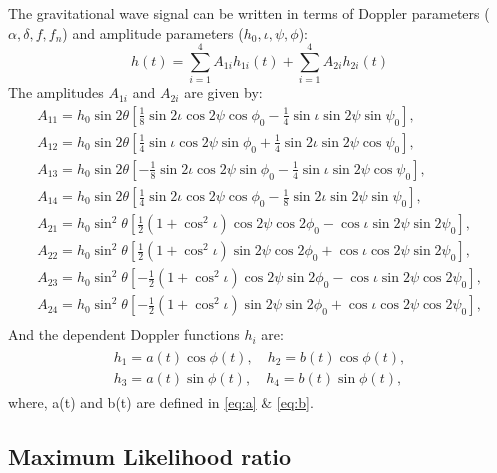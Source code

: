 \documentclass{ttuthes2007}
\begin{document}
The gravitational wave signal can be written in terms of Doppler
parameters ($\alpha, \delta, f, f_n $) and amplitude parameters ($h_0, \iota, \psi,
\phi$):
\begin{equation}
h(t) = \sum_{i=1}^{4}A_{1i} h_{1i}(t) + \sum_{i=1}^{4} A_{2i} h_{2i}(t)
\end{equation}
The amplitudes $A_{1i}$ and $A_{2i}$ are given by:
\begin{align*}
A_{11} = h_0 \sin{2\theta}\left[\frac{1}{8} \sin{2\iota}\cos{2\psi}\cos{\phi_0}-
\frac{1}{4}\sin{\iota} \sin{2\psi}\sin{\psi_0}\right], \\
A_{12} = h_0 \sin{2\theta}\left[\frac{1}{4} \sin{\iota}\cos{2\psi}\sin{\phi_0}+
\frac{1}{4}\sin{2\iota} \sin{2\psi}\cos{\psi_0}\right], \\
A_{13} = h_0 \sin{2\theta}\left[-\frac{1}{8} \sin{2\iota}\cos{2\psi}\sin{\phi_0}
-\frac{1}{4}\sin{\iota} \sin{2\psi}\cos{\psi_0}\right], \\
A_{14} = h_0 \sin{2\theta}\left[\frac{1}{4} \sin{2\iota}\cos{2\psi}\cos{\phi_0}-
\frac{1}{8}\sin{2\iota} \sin{2\psi}\sin{\psi_0}\right], \\
A_{21} = h_0 \sin^2{\theta}\left[\frac{1}{2}
(1+\cos^2{\iota})\cos{2\psi}\cos{2\phi_0}- \cos{\iota} \sin{2\psi}\sin{2\psi_0}\right], \\
A_{22} = h_0 \sin^2{\theta}\left[\frac{1}{2}
(1+\cos^2{\iota})\sin{2\psi}\cos{2\phi_0} + \cos{\iota} \cos{2\psi}\sin{2\psi_0}\right], \\
A_{23} = h_0 \sin^2{\theta}\left[-\frac{1}{2}
(1+\cos^2{\iota})\cos{2\psi}\sin{2\phi_0}- \cos{\iota} \sin{2\psi}\cos{2\psi_0}\right], \\
A_{24} = h_0 \sin^2{\theta}\left[-\frac{1}{2}
(1+\cos^2{\iota})\sin{2\psi}\sin{2\phi_0} + \cos{\iota} \cos{2\psi}\cos{2\psi_0}\right], \\
\end{align*}
And the dependent Doppler functions $h_{i}$ are:
\begin{align}
\begin{split}\label{h}
h_{1}=a(t) \cos{\phi(t)},\quad h_{2}=b(t) \cos{\phi(t)},\\ 
h_{3}=a(t) \sin{\phi(t)},\quad h_{4}=b(t) \sin{\phi(t)}, 
\end{split}
\end{align}
where, a(t) and b(t) are defined in \ref{eq:a} \& \ref{eq:b}.



\subsection{Maximum Likelihood ratio}
\end{document}
